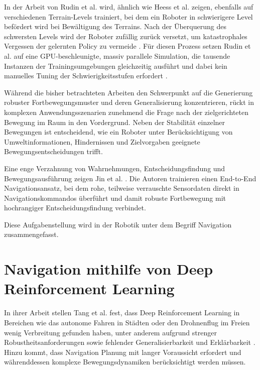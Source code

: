 In der Arbeit von Rudin et al. \cite{rudin2022learningwalkminutesusing} wird, ähnlich wie Heess et al. \cite{heessEmergenceLocomotionBehaviours2017} zeigen, ebenfalls auf verschiedenen Terrain-Levels trainiert, bei dem ein Roboter in schwierigere Level befördert wird bei Bewältigung des Terrains. Nach der Überquerung des schwersten Levels wird der Roboter zufällig zurück versetzt, um katastrophales Vergessen der gelernten Policy zu vermeide \cite{rudin2022learningwalkminutesusing}. Für diesen Prozess setzen Rudin et al. auf eine GPU-beschleunigte, massiv parallele Simulation, die tausende Instanzen der Trainingsumgebungen gleichzeitig ausführt und dabei kein manuelles Tuning der Schwierigkeitsstufen erfordert \cite{rudin2022learningwalkminutesusing}. \newline

Während die bisher betrachteten Arbeiten den Schwerpunkt auf die Generierung robuster Fortbewegungsmuster und deren Generalisierung konzentrieren, rückt in komplexen Anwendungsszenarien zunehmend die Frage nach der zielgerichteten Bewegung im Raum in den Vordergrund. Neben der Stabilität einzelner Bewegungen ist entscheidend, wie ein Roboter unter Berücksichtigung von Umweltinformationen, Hindernissen und Zielvorgaben geeignete Bewegungsentscheidungen trifft.

Eine enge Verzahnung von Wahrnehmungen, Entscheidungsfindung und Bewegungsausführung zeigen Jin et al. \cite{jinResilientLeggedLocal2023}. Die Autoren trainieren einen End-to-End Navigationsansatz, bei dem rohe, teilweise verrauschte Sensordaten direkt in Navigationskommandos überführt und damit robuste Fortbewegung mit hochrangiger Entscheidungsfindung verbindet.

Diese Aufgabenstellung wird in der Robotik unter dem Begriff Navigation zusammengefasst.

\section{Navigation mithilfe von Deep Reinforcement Learning} %
In ihrer Arbeit stellen Tang et al. fest, dass Deep Reinforcement Learning in Bereichen wie das autonome Fahren in Städten oder den Drohnenflug im Freien wenig Verbreitung gefunden haben, unter anderem aufgrund strenger Robustheitsanforderungen sowie fehlender Generalisierbarkeit und Erklärbarkeit \cite{tangDeepReinforcementLearning2024}. Hinzu kommt, dass Navigation Planung mit langer Voraussicht erfordert und währenddessen komplexe Bewegungsdynamiken berücksichtigt werden müssen.

